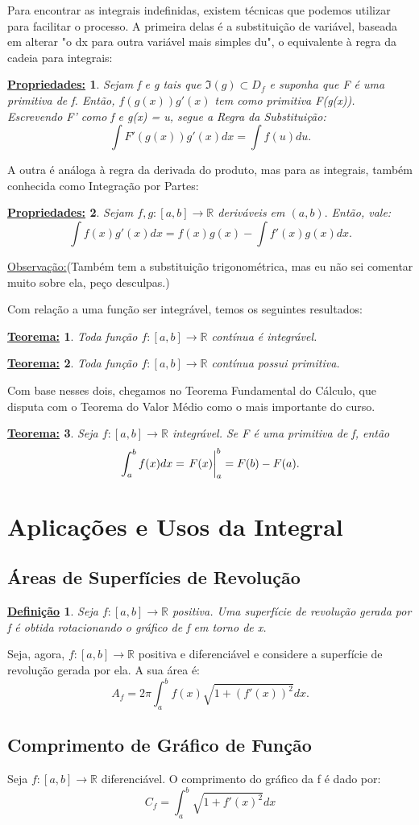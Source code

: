 \documentclass{article}
\newtheorem*{def*}{\underline{Defini\c c\~ao}}
\newtheorem*{prop*}{\underline{Propriedades:}}
\newtheorem*{thm*}{\underline{Teorema:}}
\begin{document}
    Para encontrar as integrais indefinidas, existem t\'ecnicas que podemos utilizar para facilitar o processo. A primeira delas \'e a substitui\c c\~ao de vari\'avel,
    baseada em alterar "o dx para outra vari\'avel mais simples du", o equivalente \`a regra da cadeia para integrais:
    \begin{prop*}
        Sejam f e g tais que $\Im(g)\subset{D_f}$ e suponha que F \'e uma primitiva de f. Ent\~ao, $f(g(x))g'(x)$ tem como primitiva F(g(x)). Escrevendo F' como f
        e g(x) = u, segue a Regra da Substitui\c c\~ao:
        $$
            \int F'(g(x))g'(x)dx = \int f(u) du.
        $$
    \end{prop*}
    A outra \'e an\'aloga \`a regra da derivada do produto, mas para as integrais, tamb\'em conhecida como Integra\c c\~ao por Partes:
    \begin{prop*}
        Sejam $f, g:[a, b]\rightarrow\mathbb{R}$ deriv\'aveis em $(a, b).$ Ent\~ao, vale:
        $$
            \int f(x)g'(x)dx = f(x)g(x) - \int f'(x)g(x)dx.
        $$
    \end{prop*}
    \underline{Observa\c c\~ao:}(Tamb\'em tem a substitui\c c\~ao trigonom\'etrica, mas eu n\~ao sei comentar muito sobre ela, pe\c co desculpas.)

    Com rela\c c\~ao a uma fun\c c\~ao ser integr\'avel, temos os seguintes resultados:
    \begin{thm*}
        Toda fun\c c\~ao $f:[a, b]\rightarrow\mathbb{R}$ cont\'inua \'e integr\'avel.
    \end{thm*}
    \begin{thm*}
        Toda fun\c c\~ao $f:[a, b]\rightarrow\mathbb{R}$ cont\'inua possui primitiva.
    \end{thm*}
    Com base nesses dois, chegamos no Teorema Fundamental do C\'alculo, que disputa com o Teorema do Valor M\'edio como o mais importante do curso.
    \begin{thm*}
        Seja $f:[a, b]\rightarrow\mathbb{R}$ integr\'avel. Se F \'e uma primitiva de f, ent\~ao
        $$
            \int_{a}^{b} f(x)dx = \eval{F(x)}_{a}^{b} = F(b) - F(a).
        $$
    \end{thm*}

    \section{Aplica\c c\~oes e Usos da Integral}
    \subsection{\'Areas de Superf\'icies de Revolu\c c\~ao}
    \begin{def*}
        Seja $f:[a, b]\rightarrow\mathbb{R}$ positiva. Uma superf\'icie de revolu\c c\~ao gerada por f \'e obtida rotacionando 
        o gr\'afico de f em torno de x.
    \end{def*}
    Seja, agora, $f:[a, b]\rightarrow\mathbb{R}$ positiva e diferenci\'avel e considere a superf\'icie de revolu\c c\~ao gerada por ela.
    A sua \'area \'e:
    $$
        A_f = 2\pi\int_{a}^{b} f(x)\sqrt{1+(f'(x))^2}dx.
    $$
    \subsection{Comprimento de Gr\'afico de Fun\c c\~ao}
    Seja $f:[a, b]\rightarrow\mathbb{R}$ diferenci\'avel. O comprimento do gr\'afico da f \'e dado por:
    $$
        C_f = \int_{a}^{b} \sqrt{1+f'(x)^2}dx
    $$
\end{document}
